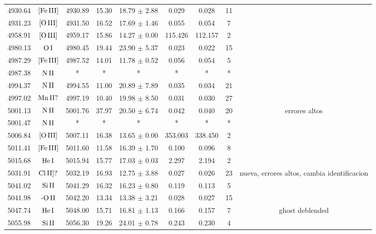 \documentclass{article}
\begin{document}
\begin{table*}
\begin{adjustbox}{width=\textwidth}
\begin{tabular}{ccccccccc}
4930.64 & $\mbox{[Fe}\thinspace \mbox{III]}$ & 4930.89 & 15.30 & 18.79 $\pm$ 2.88 & 0.029 & 0.028 & 11 &  \\
4931.23 & $\mbox{[O}\thinspace \mbox{III]}$ & 4931.50 & 16.52 & 17.69 $\pm$ 1.46 & 0.055 & 0.054 & 7 &  \\
4958.91 & $\mbox{[O}\thinspace \mbox{III]}$ & 4959.17 & 15.86 & 14.27 $\pm$ 0.00 & 115.426 & 112.157 & 2 &  \\
4980.13 & $\mbox{O}\thinspace \mbox{I}$ & 4980.45 & 19.44 & 23.90 $\pm$ 5.37 & 0.023 & 0.022 & 15 &  \\
4987.29 & $\mbox{[Fe}\thinspace \mbox{III]}$ & 4987.52 & 14.01 & 11.78 $\pm$ 0.52 & 0.056 & 0.054 & 5 &  \\
4987.38 & $\mbox{N}\thinspace \mbox{II}$ & * & * & * & * & * & * &  \\
4994.37 & $\mbox{N}\thinspace \mbox{II}$ & 4994.55 & 11.00 & 20.89 $\pm$ 7.89 & 0.035 & 0.034 & 21 &  \\
4997.02 & $\mbox{Mn}\thinspace \mbox{II?}$ & 4997.19 & 10.40 & 19.98 $\pm$ 8.50 & 0.031 & 0.030 & 27 &  \\
5001.13 & $\mbox{N}\thinspace \mbox{II}$ & 5001.76 & 37.97 & 20.50 $\pm$ 6.74 & 0.042 & 0.040 & 20 &  errores altos \\
5001.47 & $\mbox{N}\thinspace \mbox{II}$ & * & * & * & * & * & * &  \\
5006.84 & $\mbox{[O}\thinspace \mbox{III]}$ & 5007.11 & 16.38 & 13.65 $\pm$ 0.00 & 353.003 & 338.450 & 2 &  \\
5011.41 & $\mbox{[Fe}\thinspace \mbox{III]}$ & 5011.60 & 11.58 & 16.39 $\pm$ 1.70 & 0.100 & 0.096 & 8 &  \\
5015.68 & $\mbox{He}\thinspace \mbox{I}$ & 5015.94 & 15.77 & 17.03 $\pm$ 0.03 & 2.297 & 2.194 & 2 &  \\
5031.91 & $\mbox{Cl}\thinspace \mbox{II]?}$ & 5032.19 & 16.93 & 12.75 $\pm$ 3.88 & 0.027 & 0.026 & 23 &  nueva, errores altos, cambia identificacion \\
5041.02 & $\mbox{Si}\thinspace \mbox{II}$ & 5041.29 & 16.32 & 16.23 $\pm$ 0.80 & 0.119 & 0.113 & 5 &  \\
5041.98 & $\mbox{-O}\thinspace \mbox{II}$ & 5042.20 & 13.34 & 13.38 $\pm$ 3.21 & 0.028 & 0.027 & 15 &  \\
5047.74 & $\mbox{He}\thinspace \mbox{I}$ & 5048.00 & 15.71 & 16.81 $\pm$ 1.13 & 0.166 & 0.157 & 7 &  ghost deblended \\
5055.98 & $\mbox{Si}\thinspace \mbox{II}$ & 5056.30 & 19.26 & 24.01 $\pm$ 0.78 & 0.243 & 0.230 & 4 &  \\

\end{tabular}
\end{adjustbox}
\end{table*}
\end{document}
